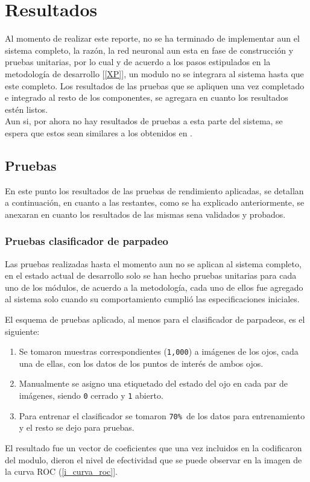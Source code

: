 \documentclass[12pt]{book} %
\begin{document}
\newpage	

\chapter*{Resultados}
\markboth{}{}
\thispagestyle{empty}
\lhead[\thepage]{}
\rhead[]{\thepage}

	Al momento de realizar este reporte, no se ha terminado de implementar aun el sistema completo, la razón, la red neuronal aun
	esta en fase de construcción y pruebas unitarias, por lo cual y de acuerdo a los pasos estipulados en la metodología de  desarrollo [\ref{XP}],
	un modulo no se integrara al sistema hasta que este completo.
	Los resultados de las pruebas que se apliquen una vez completado e integrado al resto de los componentes, se agregara en cuanto los 
	resultados estén listos.\\
	Aun si, por ahora no hay resultados de pruebas a esta parte del sistema, se espera que estos sean similares a los obtenidos en \cite{Sugano}.
	


\section{Pruebas}
	En este punto los resultados de las pruebas de rendimiento aplicadas, se detallan a continuación, en cuanto a las restantes, como se ha
	explicado anteriormente, se anexaran en cuanto los resultados de las mismas sena validados y probados.
	
	\subsection{Pruebas clasificador de parpadeo}
	
		Las pruebas realizadas hasta el momento aun no se aplican al sistema completo, en el estado actual de desarrollo solo se han hecho pruebas
		unitarias para cada uno de los módulos, de acuerdo a la metodología, cada uno de ellos fue agregado al sistema solo cuando su comportamiento 
		cumplió las  especificaciones iniciales.
		
		El esquema de pruebas aplicado, al menos para el clasificador de parpadeos, es el siguiente:
		\begin{multicols}{2}
			\begin{enumerate}
				\item Se tomaron muestras correspondientes (\texttt{1,000}) a imágenes de los ojos, cada una de ellas, con los datos de los puntos
					de interés de ambos ojos. 
				\item Manualmente se asigno una etiquetado del estado del ojo en cada par de imágenes, siendo \texttt{0} cerrado y \texttt{1} abierto.
				\item Para entrenar el clasificador se tomaron \texttt{70\% }de los datos para entrenamiento y el resto se dejo para pruebas.
			\end{enumerate}
		\end{multicols}
		El resultado fue un vector de coeficientes que una vez incluidos en la codificaron del modulo, dieron el nivel de efectividad que se puede 
		observar  en la imagen de la curva ROC (\ref{i_curva_roc}].
		
\end{document}
